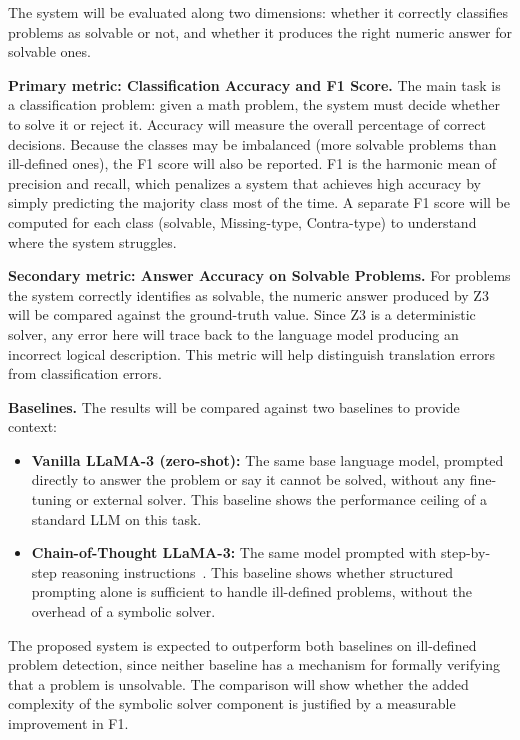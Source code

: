 \documentclass[sigconf, nonacm, onecolumn]{acmart}
\begin{document}
The system will be evaluated along two dimensions: whether it correctly classifies
problems as solvable or not, and whether it produces the right numeric answer for solvable
ones.

\textbf{Primary metric: Classification Accuracy and F1 Score.} The main task is a
classification problem: given a math problem, the system must decide whether to solve it
or reject it. Accuracy will measure the overall percentage of correct decisions. Because
the classes may be imbalanced (more solvable problems than ill-defined ones), the F1 score
will also be reported. F1 is the harmonic mean of precision and recall, which penalizes a
system that achieves high accuracy by simply predicting the majority class most of the
time. A separate F1 score will be computed for each class (solvable, Missing-type,
Contra-type) to understand where the system struggles.

\textbf{Secondary metric: Answer Accuracy on Solvable Problems.} For problems the
system correctly identifies as solvable, the numeric answer produced by Z3 will be
compared against the ground-truth value. Since Z3 is a deterministic solver, any error
here will trace back to the language model producing an incorrect logical description.
This metric will help distinguish translation errors from classification errors.

\textbf{Baselines.} The results will be compared against two baselines to provide context:

\begin{itemize}
  \item \textbf{Vanilla LLaMA-3 (zero-shot):} The same base language model, prompted
  directly to answer the problem or say it cannot be solved, without any fine-tuning or
  external solver. This baseline shows the performance ceiling of a standard LLM on this
  task.

  \item \textbf{Chain-of-Thought LLaMA-3:} The same model prompted with step-by-step
  reasoning instructions~\cite{wei2022}. This baseline shows whether structured prompting
  alone is sufficient to handle ill-defined problems, without the overhead of a symbolic
  solver.
\end{itemize}

The proposed system is expected to outperform both baselines on ill-defined problem
detection, since neither baseline has a mechanism for formally verifying that a problem is
unsolvable. The comparison will show whether the added complexity of the symbolic solver
component is justified by a measurable improvement in F1.
\end{document}
